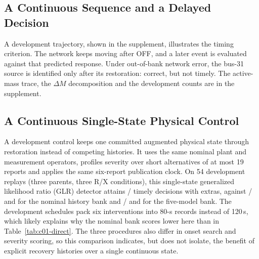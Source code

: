 \subsection{A Continuous Sequence and a Delayed Decision}
A development trajectory, shown in the supplement, illustrates the
timing criterion. The network keeps moving after OFF, and a
later event is evaluated against that predicted response. Under
out-of-bank network error, the bus-31 source is identified only after its
restoration: correct, but not timely. The active-mass trace, the
$\Delta M$ decomposition and the development counts are in the supplement.

\subsection{A Continuous Single-State Physical Control}
A development control keeps one committed augmented physical state through
restoration instead of competing histories. It uses the same nominal plant
and measurement operators, profiles severity over short alternatives of at
most 19 reports and applies the same six-report publication clock. On 54
development replays (three parents, three R/X conditions), this
single-state generalized likelihood ratio (GLR) detector attains
\SSSimpleTimely/\SSSimpleTotal{} timely decisions with \SSSimpleExtras{}
extras, against \SSNomTimely/\SSNomTotal{} and \SSNomExtras{} for the nominal
history bank and \SSMixTimely/\SSMixTotal{} and \SSMixExtras{} for the
five-model bank. The development schedules pack six interventions into
80-s records instead of 120\,s, which likely explains why the nominal bank
scores lower here than in Table~\ref{tab:c01-direct}. The three procedures also
differ in onset search and severity scoring, so this comparison indicates,
but does not isolate, the benefit of explicit recovery histories over a
single continuous state.
